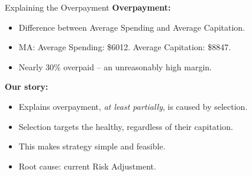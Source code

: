 \begin{frame}[label=explain_overpayment]{Explaining the Overpayment}
    \textbf{Overpayment:}
    \begin{itemize}
        \item Difference between Average Spending and Average Capitation.
        \item MA: Average Spending: \$6012. Average Capitation: \$8847.
        \item Nearly 30\% overpaid – an unreasonably high margin.
    \end{itemize}
    \hyperlink{overpayment_distribution}{}
    \hyperlink{tab:personal_level_summary}{}
    \vfill
    \textbf{Our story:}
    \begin{itemize}
        \item Explains overpayment, \textit{at least partially}, is caused by selection.
        \item Selection targets the healthy, regardless of their capitation.
        \item This makes strategy simple and feasible.
        \item Root cause: current Risk Adjustment.
    \end{itemize}
\end{frame}


